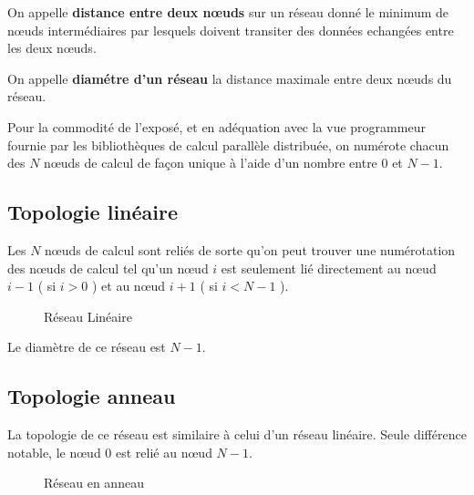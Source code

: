 \documentclass[fleqn,11pt]{article}
\begin{document}
On appelle \textbf{distance entre deux nœuds} sur un réseau donné le minimum de nœuds
intermédiaires par lesquels doivent transiter des données echangées entre les deux
nœuds.

On appelle \textbf{diamétre d'un réseau} la distance maximale entre
deux nœuds du réseau. 

Pour la commodité de l'exposé, et en adéquation avec la vue programmeur
fournie par les bibliothèques de calcul parallèle distribuée, on numérote
chacun des $N$ nœuds de calcul de façon unique à l'aide d'un nombre entre
0 et $N-1$.

\subsection{Topologie linéaire}

Les $N$ nœuds de calcul sont reliés de sorte qu'on peut trouver une numérotation
des nœuds de calcul tel qu'un nœud $i$ est seulement lié directement au
nœud $i-1$ ( si $ i > 0$ ) et au nœud $i+1$ ( si $i < N-1$ ).

\begin{figure}
\begin{center}
\end{center}
\caption{Réseau Linéaire}
\label{fig:reslin}
\end{figure}


Le diamètre de ce réseau est $N-1$.

\subsection{Topologie anneau}

La topologie de ce réseau est similaire à celui d'un réseau linéaire.
Seule différence notable, le nœud 0 est relié au nœud $N-1$.

\begin{figure}
\begin{center}
\end{center}
\label{fig:resanneau}
\caption{Réseau en anneau}
\end{figure}
\end{document}
